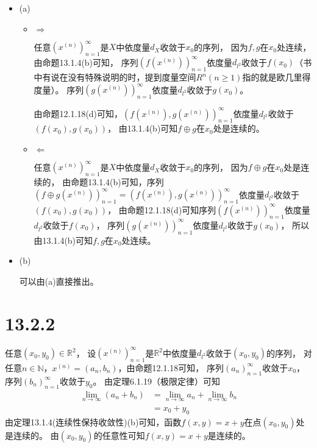 \documentclass{article}
\begin{document}
\begin{itemize}
  \item (a)

        \begin{itemize}
          \item $\Rightarrow$

                任意$(x^{(n)})_{n = 1}^\infty$是$X$中依度量$d_X$收敛于$x_0$的序列，
                因为$f,g$在$x_0$处连续，由命题13.1.4(b)可知，
                序列$(f(x^{(n)}))_{n = 1}^\infty$依度量$d_{l^2}$收敛于$f(x_0)$（书中有说在没有特殊说明的时，提到度量空间$R^n(n \geq 1)$指的就是欧几里得度量）。
                序列$(g(x^{(n)}))_{n = 1}^\infty$依度量$d_{l^2}$收敛于$g(x_0)$。

                由命题12.1.18(d)可知，$(f(x^{(n)}), g(x^{(n)}))_{n = 1}^\infty$依度量$d_{l^2}$收敛于$(f(x_0),g(x_0))$，
                由13.1.4(b)可知$f \oplus g$在$x_0$处是连续的。

          \item $\Leftarrow$

                任意$(x^{(n)})_{n = 1}^\infty$是$X$中依度量$d_X$收敛于$x_0$的序列，
                因为$f \oplus g$在$x_0$处是连续的，
                由命题13.1.4(b)可知，序列$(f \oplus g(x^{(n)}))_{n = 1}^\infty = (f(x^{(n)}), g(x^{(n)}))_{n = 1}^\infty$依度量$d_{l^2}$收敛于$(f(x_0),g(x_0))$，
                由命题12.1.18(d)可知序列$(f(x^{(n)}))_{n = 1}^\infty$依度量$d_{l^2}$收敛于$f(x_0)$，
                序列$(g(x^{(n)}))_{n = 1}^\infty$依度量$d_{l^2}$收敛于$g(x_0)$，
                所以由13.1.4(b)可知$f,g$在$x_0$处连续。


        \end{itemize}

  \item (b)

        可以由(a)直接推出。
\end{itemize}

\section*{13.2.2}

任意$(x_0, y_0) \in \mathbb{R}^2$，
设$(x^{(n)})_{n = 1}^\infty$是$\mathbb{R}^2$中依度量$d_{l^2}$收敛于$(x_0, y_0)$的序列，
对任意$n \in \mathbb{N}$，$x^{(n)} = (a_n, b_n)$，由命题12.1.18可知，
序列$(a_n)_{n = 1}^\infty$收敛于$x_0$，
序列$(b_n)_{n = 1}^\infty$收敛于$y_0$。
由定理6.1.19（极限定律）可知
\begin{align*}
  \lim\limits_{n \to \infty} (a_n + b_n) & = \lim\limits_{n \to \infty} a_n + \lim\limits_{n \to \infty} b_n \\
                                         & = x_0 + y_0
\end{align*}
由定理13.1.4(连续性保持收敛性)(b)可知，函数$f(x, y) = x + y$在点$(x_0, y_0)$处是连续的。
由$(x_0, y_0)$的任意性可知$f(x, y) = x + y$是连续的。
\end{document}
